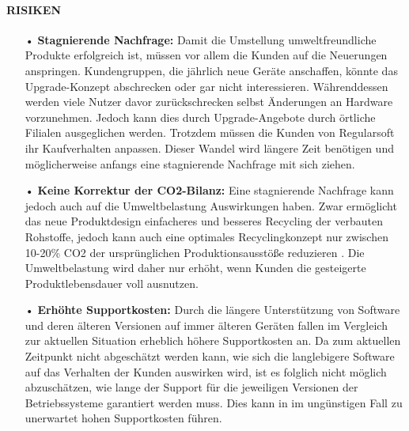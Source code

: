 \documentclass[13pt,titlepage]{article}
\begin{document}
\paragraph{RISIKEN}
\begin{itemize}
\item[•] \textbf{Stagnierende Nachfrage:}
Damit die Umstellung umweltfreundliche Produkte erfolgreich ist, müssen vor allem die Kunden auf die Neuerungen anspringen. Kundengruppen, die jährlich neue Geräte anschaffen, könnte das Upgrade-Konzept abschrecken oder gar nicht interessieren. Währenddessen werden viele Nutzer davor zurückschrecken selbst Änderungen an Hardware vorzunehmen. Jedoch kann dies durch Upgrade-Angebote durch örtliche Filialen ausgeglichen werden. Trotzdem müssen die Kunden von Regularsoft ihr Kaufverhalten anpassen. Dieser Wandel wird längere Zeit benötigen und möglicherweise anfangs eine stagnierende Nachfrage mit sich ziehen.
\item[•] \textbf{Keine Korrektur der CO2-Bilanz:}
 Eine stagnierende Nachfrage kann jedoch auch auf die Umweltbelastung Auswirkungen haben. Zwar ermöglicht das neue Produktdesign einfacheres und besseres Recycling der verbauten Rohstoffe, jedoch kann auch eine optimales Recyclingkonzept nur zwischen 10-20\% CO2 der ursprünglichen Produktionsausstöße reduzieren \cite{mp}. Die Umweltbelastung wird daher nur erhöht, wenn Kunden die gesteigerte Produktlebensdauer voll ausnutzen.
\item[•] \textbf{Erhöhte Supportkosten:}
Durch die längere Unterstützung von Software und deren älteren Versionen auf immer älteren Geräten fallen im Vergleich zur aktuellen Situation erheblich höhere Supportkosten an. Da zum aktuellen Zeitpunkt nicht abgeschätzt werden kann, wie sich die langlebigere Software auf das Verhalten der Kunden auswirken wird, ist es folglich nicht möglich abzuschätzen, wie lange der Support für die jeweiligen Versionen der Betriebssysteme garantiert werden muss. Dies kann in im ungünstigen Fall zu unerwartet hohen Supportkosten führen.
\end{itemize}
\end{document}
